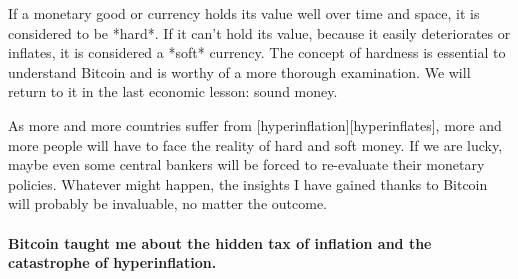 If a monetary good or currency holds its value well over time and space,
it is considered to be *hard*. If it can't hold its value, because it
easily deteriorates or inflates, it is considered a *soft* currency. The
concept of hardness is essential to understand Bitcoin and is worthy of
a more thorough examination. We will return to it in the last economic
lesson: sound money.

As more and more countries suffer from [hyperinflation][hyperinflates],
more and more people will have to face the reality of hard and soft
money. If we are lucky, maybe even some central bankers will be forced
to re-evaluate their monetary policies. Whatever might happen, the
insights I have gained thanks to Bitcoin will probably be invaluable, no
matter the outcome.

\paragraph{Bitcoin taught me about the hidden tax of inflation and the catastrophe
of hyperinflation.}

%
%
%
%
%
